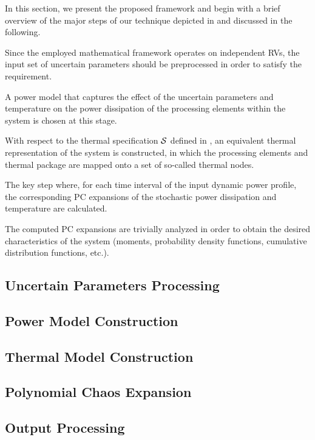 In this section, we present the proposed framework and begin with a brief overview of the major steps of our technique depicted in  and discussed in the following.

 Since the employed mathematical framework operates on independent RVs, the input set of uncertain parameters should be preprocessed in order to satisfy the requirement.

 A power model that captures the effect of the uncertain parameters and temperature on the power dissipation of the processing elements within the system is chosen at this stage.

 With respect to the thermal specification $\mathcal{S}$ defined in , an equivalent thermal representation of the system is constructed, in which the processing elements and thermal package are mapped onto a set of so-called thermal nodes.

 The key step where, for each time interval of the input dynamic power profile, the corresponding PC expansions of the stochastic power dissipation and temperature are calculated.

 The computed PC expansions are trivially analyzed in order to obtain the desired characteristics of the system (moments, probability density functions, cumulative distribution functions, etc.).

\subsection{Uncertain Parameters Processing} 


\subsection{Power Model Construction} 


\subsection{Thermal Model Construction} 


\subsection{Polynomial Chaos Expansion} 


\subsection{Output Processing} 

